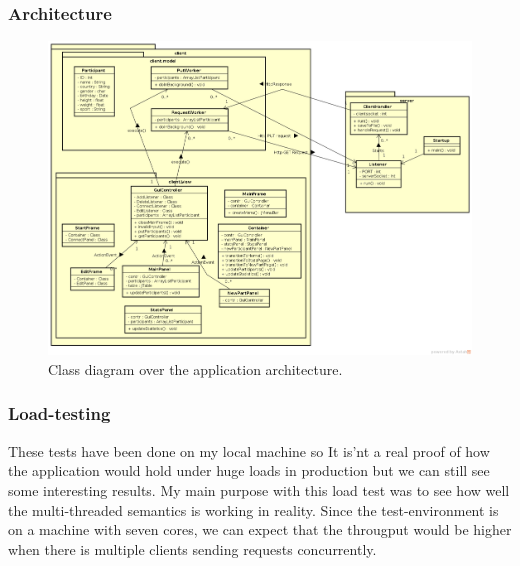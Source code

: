 \documentclass[a4paper, 11pt]{article}
\begin{document}
\subsubsection{Architecture}
\begin{figure}[H]
\includegraphics[scale=0.35]{assignment1_architecture.png}
\caption{Class diagram over the application architecture.}
\end{figure}
\subsubsection{Load-testing}
These tests have been done on my local machine so It is'nt a real proof of how the application would hold under huge loads in production but we can still see some interesting results.
My main purpose with this load test was to see how well the multi-threaded semantics is working in reality. Since the test-environment is on a machine with seven cores, we can expect that the througput would be higher when there is multiple clients sending requests concurrently. 
\end{document}
